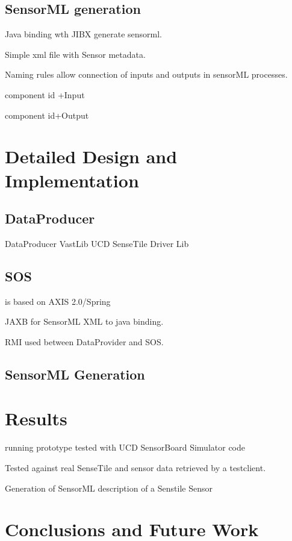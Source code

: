 \documentclass[]{final_report}
\begin{document}
\newpage
\section{SensorML generation}

Java binding wth JIBX  generate sensorml.

Simple xml file with Sensor metadata.

Naming rules allow connection of inputs and outputs
in sensorML processes.

 component id +Input

 component id+Output

\chapter{ Detailed Design and Implementation}

\section{DataProducer}

DataProducer VastLib UCD SenseTile Driver Lib

\section{SOS}
 is based on AXIS 2.0/Spring

JAXB for SensorML XML to java binding.

RMI used between DataProvider and SOS.

\section{SensorML Generation}

\chapter{Results}

running prototype tested with UCD SensorBoard Simulator code

Tested against real SenseTile and sensor data retrieved by a testclient.

Generation of SensorML description of a Senstile Sensor

\chapter{ Conclusions and Future Work}
\end{document}
